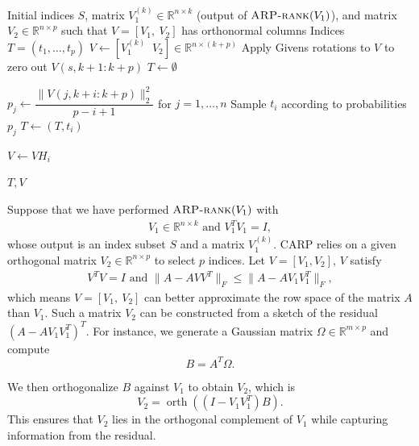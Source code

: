 \documentclass[11pt]{article}
\newcommand{\be}{\begin{eqnarray}}
\newcommand{\ee}{\end{eqnarray}}
\newcommand{\R}{\mathbb{R}}
\newcommand{\<}{\langle}
\renewcommand{\>}{\rangle}
\begin{document}
\begin{algorithm}[H]
\caption{Conditional Adaptive Randomized Pivoting (CARP)}
\label{alg:CARP}
\begin{algorithmic}[1]

\Require Initial indices $S$, matrix $V_1^{(k)} \in \mathbb{R}^{n \times k}$ (output of $\textsc{ARP-rank}(V_1)$), and matrix $V_2 \in \mathbb{R}^{n \times p}$ such that $V = [V_1,\ V_2]$ has orthonormal columns
\Ensure Indices $T = (t_1, \ldots, t_p)$
\State $V \gets [V_1^{(k)} \;\; V_2] \in \mathbb{R}^{n \times (k+p)}$
    \State Apply Givens rotations to $V$ to zero out $V(s, k+1:k+p)$
\EndFor
\State $T \gets \emptyset$

    \State $p_j \gets \dfrac{\|V(j, k+i:k+p)\|_2^2}{p-i+1}$ for $j = 1, \ldots, n$
    \State Sample $t_i$ according to probabilities $p_j$
    \State $T \gets (T, t_i)$
    
    \State $V \gets V H_i$
\EndFor

\State \Return $T,V$
\EndFunction
\end{algorithmic}
\end{algorithm}

Suppose that we have performed $\textsc{ARP-rank}(V_1)$ with 
\be
V_1\in \R^{n\times k} \text{ and } V_1^TV_1 = I,
\ee
whose output is an index subset $S$ and a matrix $V_1^{(k)}$. CARP relies on a given orthogonal matrix $V_2\in \R^{n\times p}$ to select $p$ indices. Let $V = [V_1, V_2]$, $V$ satisfy
\be
V^TV = I \text{ and } \|A - AVV^T\|_F \le \|A - AV_1V_1^T\|_F,
\ee
which means $V = [V_1,\ V_2]$ can better approximate the row space of the matrix $A$ than $V_1$. Such a matrix $V_2$ can be constructed from a sketch of the residual 
$\left(A - AV_1V_1^T\right)^T$. For instance, we generate a Gaussian 
matrix $\Omega \in \mathbb{R}^{m \times p}$ and compute
\[
B = A^T \Omega.
\]

We then orthogonalize $B$ against $V_1$ to obtain $V_2$, which is 
\[
V_2=\operatorname{orth}\left((I - V_1V_1^T)B\right).
\]
This ensures that $V_2$ lies in the orthogonal complement of $V_1$ 
while capturing information from the residual.

\def\cell{0.55}
\def\nrows{8}
\def\ncols{5}   %
\end{document}
